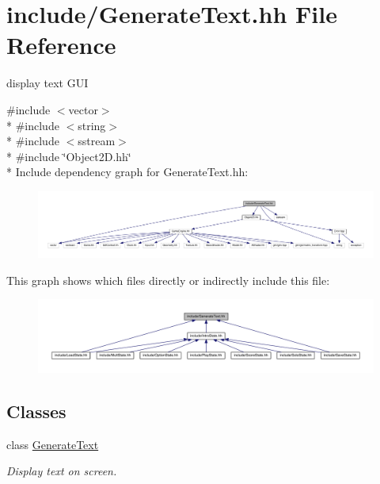 \hypertarget{_generate_text_8hh}{}\section{include/\+Generate\+Text.hh File Reference}
\label{_generate_text_8hh}


display text G\+U\+I  


{\ttfamily \#include $<$vector$>$}\\*
{\ttfamily \#include $<$string$>$}\\*
{\ttfamily \#include $<$sstream$>$}\\*
{\ttfamily \#include \char`\"{}Object2\+D.\+hh\char`\"{}}\\*
Include dependency graph for Generate\+Text.\+hh\+:\nopagebreak
\begin{figure}[H]
\begin{center}
\leavevmode
\includegraphics[width=350pt]{_generate_text_8hh__incl}
\end{center}
\end{figure}
This graph shows which files directly or indirectly include this file\+:\nopagebreak
\begin{figure}[H]
\begin{center}
\leavevmode
\includegraphics[width=350pt]{_generate_text_8hh__dep__incl}
\end{center}
\end{figure}
\subsection*{Classes}
\begin{DoxyCompactItemize}
\item 
class \hyperlink{class_generate_text}{Generate\+Text}
\begin{DoxyCompactList}\small\item\em Display text on screen. \end{DoxyCompactList}\end{DoxyCompactItemize}
